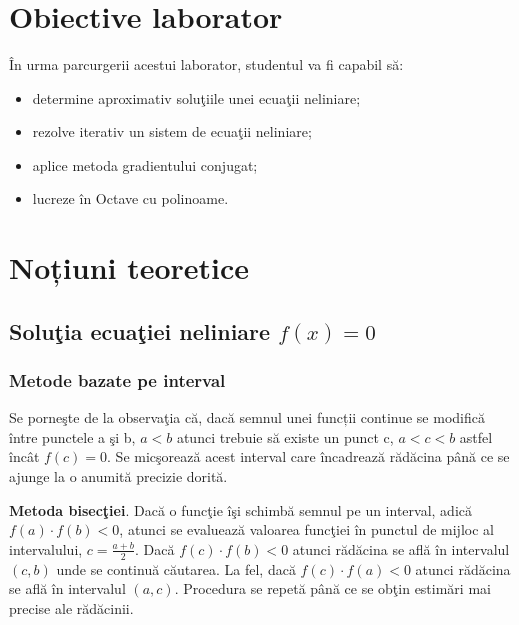 \documentclass{exam}
\title{
	\textmd{\textbf{\MNLabTitle}}
	\author{}
    \date{}
}
\begin{document}
\begin{coverpages}

	\maketitle
	\tableofcontents

\end{coverpages}

\section{Obiective laborator}
În urma parcurgerii acestui laborator, studentul va fi capabil să:
\begin{itemize}
	\item determine aproximativ soluţiile unei ecuaţii neliniare;
	\item rezolve iterativ un sistem de ecuaţii neliniare;
        \item aplice metoda gradientului conjugat;
	\item lucreze în Octave cu polinoame.
\end{itemize}

\section{Noțiuni teoretice}

\subsection{Soluţia ecuaţiei neliniare $f(x) = 0$}

\subsubsection{Metode bazate pe interval}

Se porneşte de la observaţia că, dacă semnul unei funcții continue se modifică între punctele a şi b, $a < b$ atunci trebuie să existe un punct c, $a < c < b$ 
 astfel încât $f(c) = 0$. Se micşorează acest interval care încadrează rădăcina până ce se ajunge la o anumită precizie dorită.

\textbf{Metoda bisecţiei}. Dacă o funcţie îşi schimbă semnul pe un interval, adică $f(a)\cdot f(b)<0$, atunci se evaluează valoarea funcţiei în punctul de mijloc al intervalului, $c = \frac{a + b}{2}$. Dacă  $f(c)\cdot f(b)<0$ atunci rădăcina se află în intervalul $(c, b)$ unde se continuă căutarea. La fel, dacă  $f(c)\cdot f(a)<0$ atunci rădăcina se află în intervalul $(a, c)$. Procedura se repetă până ce se obţin estimări mai precise ale rădăcinii.
\end{document}
